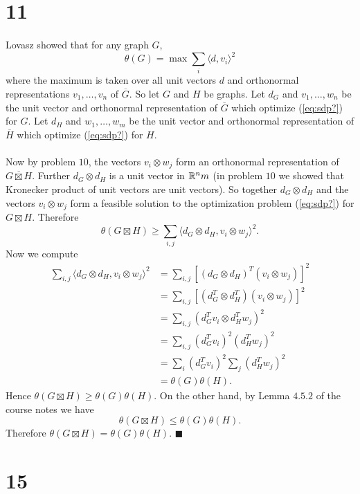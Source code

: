 \documentclass[letterpaper,12pt,oneside,onecolumn]{article}
\newcommand{\1}{\mathbbm{1}}
\begin{document}
\section*{11}
\paragraph{}
Lovasz showed that for any graph $G$,
\begin{equation}\theta(G) = \max \sum_{i} \langle d, v_i\rangle ^2\label{eq:sdp?} \end{equation}
where the maximum is taken over all unit vectors $d$ and orthonormal representations $v_1, \dots, v_n$ of $\overline{G}$. So let $G$ and $H$ be graphs. Let $d_G$ and $v_1, \dots, w_n$ be the unit vector and orthonormal representation of $\overline{G}$ which optimize (\ref{eq:sdp?}) for $G$. Let $d_H$ and $w_1, \dots, w_m$ be the unit vector and orthonormal representation of $\overline{H}$ which optimize (\ref{eq:sdp?}) for $H$.
\paragraph{}
Now by problem $10$, the vectors $v_i \otimes w_j$ form an orthonormal representation of $\overline{G \boxtimes H}$. Further $d_G \otimes d_H$ is a unit vector in $\mathbb{R}^nm$ (in problem $10$ we showed that Kronecker product of unit vectors are unit vectors). So together $d_G \otimes d_H$ and the vectors $v_i \otimes w_j$ form a feasible solution to the optimization problem (\ref{eq:sdp?}) for $G \boxtimes H$. Therefore
$$\theta(G\boxtimes H) \geq \sum_{i,j} \langle d_G\otimes d_H, v_i \otimes w_j \rangle^2.$$
Now we compute
\begin{align*}
\sum_{i,j} \langle d_G\otimes d_H, v_i \otimes w_j \rangle^2  &= \sum_{i,j}[(d_G\otimes d_H)^T(v_i \otimes w_j)]^2 \\
&= \sum_{i,j}[(d_G^T \otimes d_H^T)(v_i \otimes w_j)]^2 \\
&= \sum_{i,j}(d_G^Tv_i \otimes d_H^Tw_j)^2 \\
&= \sum_{i,j}(d_G^Tv_i)^2 (d_H^Tw_j)^2 \\
&= \sum_i (d_G^Tv_i)^2 \sum_j (d_H^Tw_j)^2\\
&= \theta(G)\theta(H).
\end{align*}
Hence $\theta(G\boxtimes H) \geq \theta(G)\theta(H)$. On the other hand, by Lemma $4.5.2$ of the course notes we have
$$\theta(G\boxtimes H) \leq \theta(G) \theta(H).$$
Therefore $\theta(G \boxtimes H) = \theta(G) \theta(H)$. $\blacksquare$
\section*{15}
\end{document}
